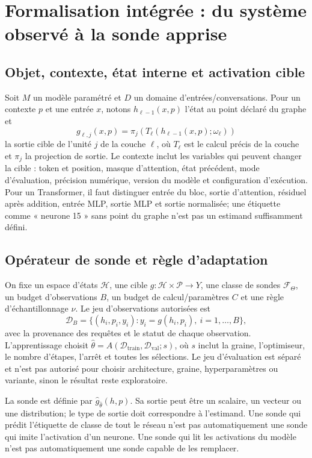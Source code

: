 \documentclass[11pt,a4paper,oneside]{report}
\newcommand{\Hcal}{\mathcal H}
\newcommand{\Pcal}{\mathcal P}
\newcommand{\Dcal}{\mathcal D}
\begin{document}
\chapter{Formalisation intégrée : du système observé à la sonde apprise}
\section{Objet, contexte, état interne et activation cible}
Soit \(M\) un modèle paramétré et \(D\) un domaine d'entrées/conversations. Pour un contexte \(p\) et une entrée \(x\), notons \(h_{\ell-1}(x,p)\) l'état au point déclaré du graphe et
\[
g_{\ell,j}(x,p)=\pi_j\!\left(T_\ell(h_{\ell-1}(x,p);\omega_\ell)\right)
\]
la sortie cible de l'unité \(j\) de la couche \(\ell\), où \(T_\ell\) est le calcul précis de la couche et \(\pi_j\) la projection de sortie. Le contexte inclut les variables qui peuvent changer la cible : token et position, masque d'attention, état précédent, mode d'évaluation, précision numérique, version du modèle et configuration d'exécution. Pour un Transformer, il faut distinguer entrée du bloc, sortie d'attention, résiduel après addition, entrée MLP, sortie MLP et sortie normalisée; une étiquette comme « neurone 15 » sans point du graphe n'est pas un estimand suffisamment défini.

\section{Opérateur de sonde et règle d'adaptation}
On fixe un espace d'états \(\Hcal\), une cible \(g:\Hcal\times\Pcal\to Y\), une classe de sondes \(\mathcal F_\Theta\), un budget d'observations \(B\), un budget de calcul/paramètres \(C\) et une règle d'échantillonnage \(\nu\). Le jeu d'observations autorisées est
\[
\Dcal_B=\{(h_i,p_i,y_i): y_i=g(h_i,p_i),\ i=1,\dots,B\},
\]
avec la provenance des requêtes et le statut de chaque observation. L'apprentissage choisit \(\hat\theta=A(\Dcal_{\mathrm{train}},\Dcal_{\mathrm{val}};s)\), où \(s\) inclut la graine, l'optimiseur, le nombre d'étapes, l'arrêt et toutes les sélections. Le jeu d'évaluation est séparé et n'est pas autorisé pour choisir architecture, graine, hyperparamètres ou variante, sinon le résultat reste exploratoire.

La sonde est définie par \(\hat g_{\hat\theta}(h,p)\). Sa sortie peut être un scalaire, un vecteur ou une distribution; le type de sortie doit correspondre à l'estimand. Une sonde qui prédit l'étiquette de classe de tout le réseau n'est pas automatiquement une sonde qui imite l'activation d'un neurone. Une sonde qui lit les activations du modèle n'est pas automatiquement une sonde capable de les remplacer.
\end{document}
